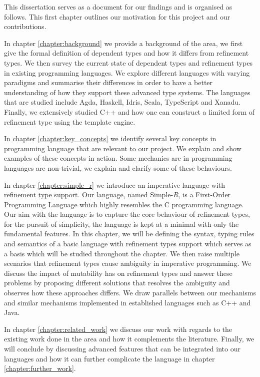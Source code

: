 \documentclass[a4paper,12pt]{report}
\begin{document}
\par
This dissertation serves as a document for our findings and is organised as 
follows. This first chapter outlines our motivation for this project and our 
contributions. 

\par
In chapter \ref{chapter:background} we provide a background of the area, we 
first give the formal definition of dependent types and how it differs 
from refinement types. We then survey the current state of 
dependent types and refinement types in existing programming languages. 
We explore different languages with varying paradigms and summarise their 
differences in order to have a better understanding of how they 
support these advanced type systems. The languages that are studied include 
Agda, Haskell, Idris, Scala, TypeScript and Xanadu. Finally, we extensively studied 
C++ and how one can construct a limited form of refinement type using the 
template engine. 

\par
In chapter \ref{chapter:key_concepts} we identify several key concepts in 
programming language that are relevant to our project. We explain 
and show examples of these concepts in action. Some mechanics are in programming 
languages are non-trivial, we explain and clarify some of these behaviours.  

\par
In chapter \ref{chapter:simple_r} we introduce an imperative language with refinement type support. 
Our language, named Simple-$R$, is a First-Order Programming Language which 
highly resembles the C programming language. Our aim with the language is to 
capture the core behaviour of refinement types, for the pursuit 
of simplicity, the language is kept at a minimal with only the fundamental features. 
In this chapter, we will be defining the syntax, typing rules and semantics 
of a basic language with refinement types support which serves as a basis 
which will be studied throughout the chapter. We then raise 
multiple scenarios that refinement types cause ambiguity in imperative programming. 
We discuss the impact of mutability has on refinement types and 
answer these problems by proposing different solutions that resolves the 
ambiguity and observes how these approaches differs. We draw parallels between 
our mechanisms and similar mechanisms implemented in established languages such 
as C++ and Java. 

\par
In chapter \ref{chapter:related_work} we discuss our work with regards to the 
existing work done in the area and how it complements the literature.
Finally, we will conclude by discussing advanced features that can be integrated 
into our languages and how it can further complicate the language in chapter 
\ref{chapter:further_work}. 
\end{document}
